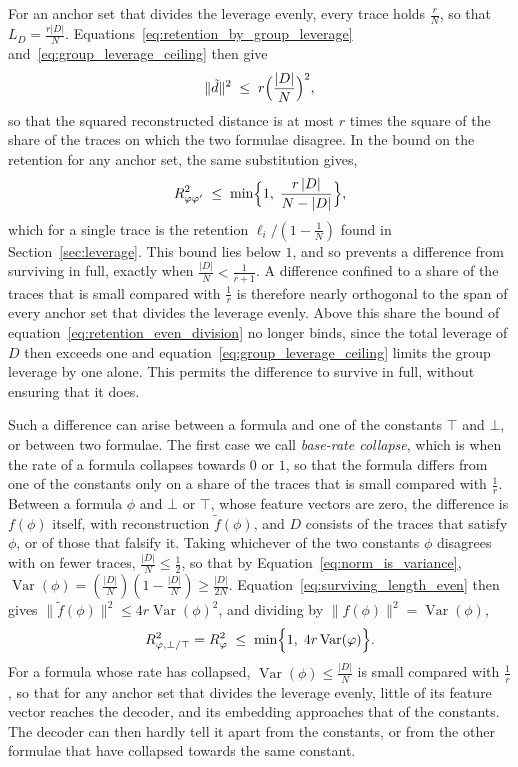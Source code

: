 \documentclass[titlepage,a4paper,11pt]{report}
\begin{document}
    For an anchor set that divides the leverage evenly, every trace holds $\frac rN$, so that $L_D = \frac{r|D|}{N}$. Equations~\eqref{eq:retention_by_group_leverage} and~\eqref{eq:group_leverage_ceiling} then give
    \begin{equation}\label{eq:surviving_length_even}
        \lVert\tilde d\rVert^2\;\le\;r\Bigl(\frac{|D|}{N}\Bigr)^2 ,
    \end{equation}
    so that the squared reconstructed distance is at most $r$ times the square of the share of the traces on which the two formulae disagree. In the bound on the retention for any anchor set, the same substitution gives,
    \begin{equation}\label{eq:retention_even_division}
        R^2_{\phi\phi'}\;\le\;\min\Bigl\{1,\;\frac{r\,|D|}{N-|D|}\Bigr\},
    \end{equation}
    which for a single trace is the retention $\ell_i/(1-\frac1N)$ found in Section~\ref{sec:leverage}. This bound lies below $1$, and so prevents a difference from surviving in full, exactly when $\frac{|D|}{N}<\frac{1}{r+1}$. A difference confined to a share of the traces that is small compared with $\frac1r$ is therefore nearly orthogonal to the span of every anchor set that divides the leverage evenly. Above this share the bound of equation~\eqref{eq:retention_even_division} no longer binds, since the total leverage of $D$ then exceeds one and equation~\eqref{eq:group_leverage_ceiling} limits the group leverage by one alone. This permits the difference to survive in full, without ensuring that it does.

    Such a difference can arise between a formula and one of the constants $\top$ and $\bot$, or between two formulae. The first case we call \emph{base-rate collapse}, which is when the rate of a formula collapses towards $0$ or $1$, so that the formula differs from one of the constants only on a share of the traces that is small compared with $\frac1r$. Between a formula $\phi$ and $\bot$ or $\top$, whose feature vectors are zero, the difference is $f(\phi)$ itself, with reconstruction $\tilde f(\phi)$, and $D$ consists of the traces that satisfy $\phi$, or of those that falsify it. Taking whichever of the two constants $\phi$ disagrees with on fewer traces, $\frac{|D|}{N}\le\frac12$, so that by Equation~\eqref{eq:norm_is_variance}, $\operatorname{Var}(\phi)=(\frac{|D|}{N})(1-\frac{|D|}{N})\ge\frac{|D|}{2N}$. Equation~\eqref{eq:surviving_length_even} then gives $\lVert\tilde f(\phi)\rVert^2\le4r\operatorname{Var}(\phi)^2$, and dividing by $\lVert f(\phi)\rVert^2=\operatorname{Var}(\phi)$,
    \begin{equation}\label{eq:retention_variance}
        R^2_{\phi,\bot/\top} = R^2_\phi\;\le\;\min\Bigl\{1,\;4r\operatorname{Var}(\phi)\Bigr\}.
    \end{equation}
    For a formula whose rate has collapsed, $\operatorname{Var}(\phi)\le\frac{|D|}{N}$ is small compared with $\frac1r$, so that for any anchor set that divides the leverage evenly, little of its feature vector reaches the decoder, and its embedding approaches that of the constants. The decoder can then hardly tell it apart from the constants, or from the other formulae that have collapsed towards the same constant.
 
\end{document}
